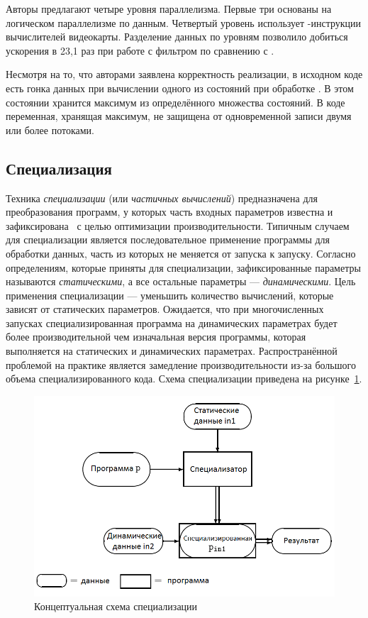 Авторы предлагают четыре уровня параллелизма.
Первые три основаны на логическом параллелизме по данным.
Четвертый уровень использует -инструкции 
вычислителей видеокарты.
Разделение данных по уровням позволило добиться ускорения в 
23,1 раз при работе с фильтром  по сравнению с
.

Несмотря на то, что авторами заявлена корректность 
реализации, в исходном коде есть гонка данных при вычислении 
одного из состояний при обработке .
В этом состоянии хранится максимум из определённого множества состояний.
В коде  переменная, хранящая максимум, 
не защищена от одновременной записи двумя или более потоками.

\subsection{Специализация}
Техника \emph{специализации} (или \emph{частичных вычислений}) предназначена для
преобразования программ, у которых часть входных параметров
известна и зафиксирована~\cite{Jones_spec} с целью оптимизации производительности.
Типичным случаем для специализации является последовательное 
применение программы для обработки данных, часть из которых 
не меняется от запуска к запуску.
Согласно определениям, которые приняты для специализации, 
зафиксированные параметры называются \emph{статическими}, а 
все остальные параметры --- \emph{динамическими}.
Цель применения специализации --- уменьшить количество 
вычислений, которые зависят от статических параметров.
Ожидается, что при многочисленных запусках специализированная 
программа на динамических параметрах будет более 
производительной чем изначальная версия программы, которая 
выполняется на статических и динамических параметрах.
Распространённой проблемой на практике является замедление 
производительности из-за большого объема специализированного
кода.
Схема специализации приведена на рисунке~\ref{spec}.
\begin{figure}[h!]
  \centering
  \includegraphics[width=\columnwidth]{spec.png}
  \caption{Концептуальная схема специализации\protect\footnotemark}
  \label{spec}
\end{figure}

